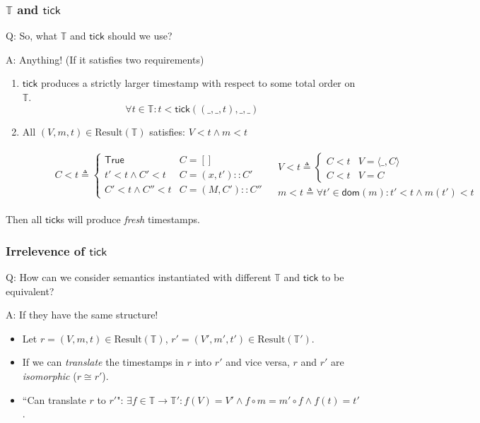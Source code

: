 \documentclass{beamer}
\newcommand*{\cons}{::}
\newcommand*{\Time}{\mathbb{T}}
\newcommand*{\mem}{m}
\newcommand*{\Result}{\text{Result}}
\newcommand*{\tick}{\mathsf{tick}}
\begin{document}
\begin{frame}[c]
  \frametitle{$\Time$ and $\tick$}
  Q: So, what $\Time$ and $\tick$ should we use?

  A: Anything! (If it satisfies two requirements)
  \pause
  \begin{enumerate}
    \item $\tick$ produces a strictly larger timestamp with respect to some total order on $\Time$.
          \[\forall t\in\Time:t<\tick((\_,\_,t),\_,\_)\]
    \item All $(V,\mem,t)\in\Result(\Time)$ satisfies: $V < t\wedge\mem < t$
          \begin{minipage}{\linewidth}
            \begin{figure}[h!]
              \scriptsize
              \[
                \begin{array}{cc}
                  C < t\triangleq
                  \begin{cases}
                    \mathsf{True}        & C=[]              \\
                    t' < t\wedge C' < t  & C=(x,t')\cons C'  \\
                    C' < t\wedge C'' < t & C=(M,C')\cons C''
                  \end{cases}
                   &
                  \begin{array}{l}
                    V < t\triangleq
                    \begin{cases}
                      C < t & V=\langle\_,C\rangle \\
                      C < t & V=C
                    \end{cases} \\
                    \mem < t\triangleq\forall t'\in\mathsf{dom}(\mem):t'<t\wedge\mem(t') < t
                  \end{array}
                \end{array}
              \]
            \end{figure}
          \end{minipage}
  \end{enumerate}
  Then all $\tick$s will produce \emph{fresh} timestamps.
\end{frame}
\begin{frame}[c]
  \frametitle{Irrelevence of $\tick$}
  Q: How can we consider semantics instantiated with different $\Time$ and $\tick$ to be equivalent?

  A: If they have the same structure!
  \pause
  \begin{itemize}
    \item Let $r=(V,\mem,t)\in\Result(\Time)$, $r'=(V',\mem',t')\in\Result(\Time')$.
    \item If we can \emph{translate} the timestamps in $r$ into $r'$ and vice versa, $r$ and $r'$ are \emph{isomorphic} ($r\cong r'$).

          \pause
    \item ``Can translate $r$ to $r'$": $\exists f\in\Time\rightarrow\Time':f(V)=V'\wedge f\circ\mem=\mem'\circ f\wedge f(t)=t'$.
  \end{itemize}
\end{frame}
\end{document}
